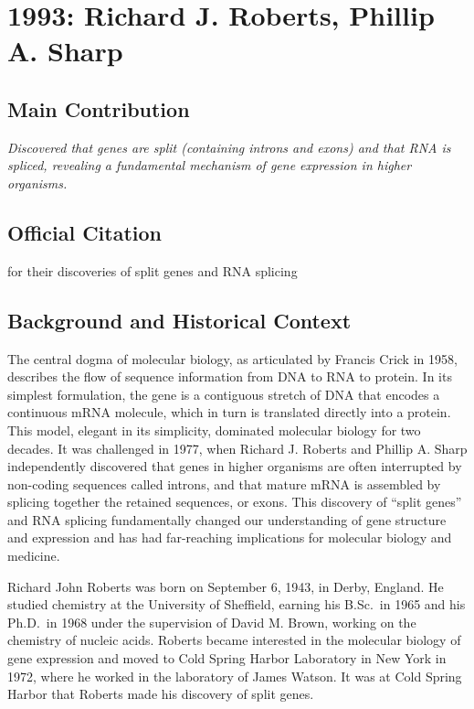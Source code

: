 \chapter[1993 --- Roberts et al.]{1993: Richard J. Roberts, Phillip A. Sharp}
\label{ch:1993_Roberts}

\section*{Main Contribution}

\textit{Discovered that genes are split (containing introns and exons) and that RNA is spliced, revealing a fundamental mechanism of gene expression in higher organisms.}\cite{nobel-1993,lecture-1993}

\section{Official Citation}

for their discoveries of split genes and RNA splicing

\section{Background and Historical Context}

The central dogma of molecular biology, as articulated by Francis Crick in 1958, describes the flow of sequence information from DNA to RNA to protein. In its simplest formulation, the gene is a contiguous stretch of DNA that encodes a continuous mRNA molecule, which in turn is translated directly into a protein. This model, elegant in its simplicity, dominated molecular biology for two decades. It was challenged in 1977, when Richard J. Roberts and Phillip A. Sharp independently discovered that genes in higher organisms are often interrupted by non-coding sequences called introns, and that mature mRNA is assembled by splicing together the retained sequences, or exons. This discovery of ``split genes'' and RNA splicing fundamentally changed our understanding of gene structure and expression and has had far-reaching implications for molecular biology and medicine.

Richard John Roberts was born on September 6, 1943, in Derby, England. He studied chemistry at the University of Sheffield, earning his B.Sc.\ in 1965 and his Ph.D.\ in 1968 under the supervision of David M. Brown, working on the chemistry of nucleic acids. Roberts became interested in the molecular biology of gene expression and moved to Cold Spring Harbor Laboratory in New York in 1972, where he worked in the laboratory of James Watson. It was at Cold Spring Harbor that Roberts made his discovery of split genes.

